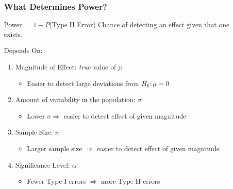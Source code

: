 \documentclass[handout]{beamer}
\begin{document}
\begin{frame}
\frametitle{What Determines Power?}
	\begin{block}{Power $ = 1 -  P$(Type II Error)}
Chance of detecting an effect given that one exists.
\end{block}
\begin{block}{Depends On:}
	\begin{enumerate}
\item Magnitude of Effect: \emph{true} value of $\mu$
	\begin{itemize}
		\item Easier to detect large deviations from $H_0\colon \mu = 0$
	\end{itemize}
\item Amount of variability in the population: $\sigma$
	\begin{itemize}
		\item Lower $\sigma \Rightarrow$ easier to detect effect of given magnitude
	\end{itemize}
\item Sample Size: $n$
\begin{itemize}
	\item Larger sample size $\Rightarrow$ easier to detect effect of given magnitude 
\end{itemize}
\item Significance Level: $\alpha$
\begin{itemize}
	\item Fewer Type I errors $\Rightarrow$ more Type II errors
\end{itemize}
\end{enumerate}
\end{block}

\end{frame}
\end{document}
